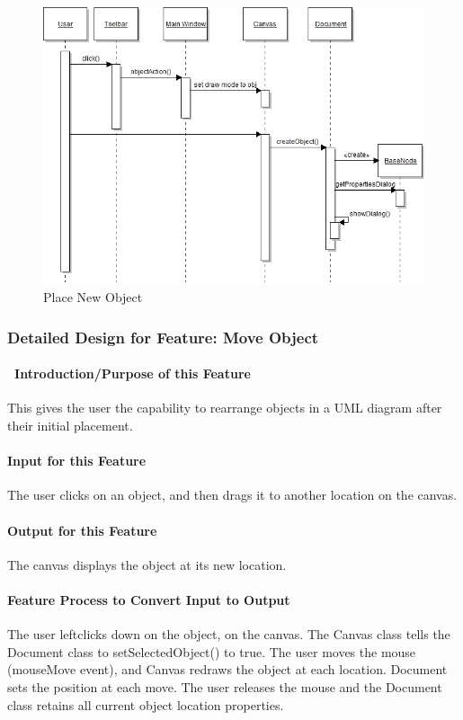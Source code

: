 \documentclass[twoside,letterpaper]{article}
\begin{document}
{\begin{figure}[h]
\centering
\includegraphics[width=6.0in]{IntNewObj.jpg}
\caption{Place New Object}
\end{figure}

\clearpage


% 
%

\subsubsection{Detailed Design for Feature: Move Object }
\paragraph[\ Introduction/Purpose of this Feature]
{\ Introduction/Purpose of this Feature}
{
This gives the user the capability to rearrange objects in a UML diagram after their initial placement.
}

\paragraph[Input for this Feature]{Input for this Feature}
{
The user clicks on an object, and then drags it to another location on the canvas.
}

\paragraph{Output for this Feature}
{
The canvas displays the object at its new location.
}

\paragraph{Feature Process to Convert Input to Output}
{
The user leftclicks down on the object, on the canvas. The Canvas class tells the Document class to setSelectedObject() to true. The user moves the mouse (mouseMove event), and Canvas redraws the object at each location. Document sets the position at each move. The user releases the mouse and the Document class retains all current object location properties.
}

}
\end{document}
